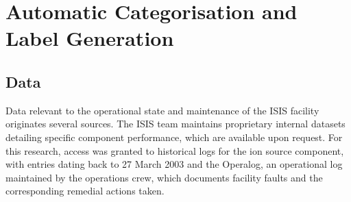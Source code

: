 \documentclass[10pt,oneside]{report}
\begin{document}

\chapter{Automatic Categorisation and Label Generation}\label{chap:Methodology}

\section{Data}

Data relevant to the operational state and maintenance of the ISIS facility originates several sources. The ISIS team maintains proprietary internal datasets detailing specific component performance, which are available upon request. For this research, access was granted to historical logs for the ion source component, with entries dating back to 27 March 2003 and the Operalog, an operational log maintained by the operations crew, which documents facility faults and the corresponding remedial actions taken.
\end{document}
